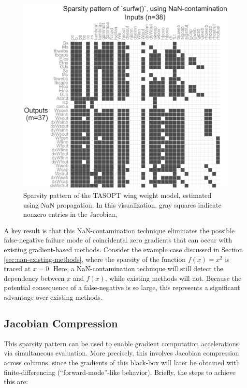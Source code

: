 \begin{figure}[H]
    \centering
    \includegraphics[width=6in]{../figures/nan-propagation/image2-crop.png}
    \caption{Sparsity pattern of the TASOPT wing weight model, estimated using NaN propagation. In this visualization, gray squares indicate nonzero entries in the Jacobian, }
    \label{fig:nan-jacobian}
\end{figure}

A key result is that this NaN-contamination technique eliminates the possible false-negative failure mode of coincidental zero gradients that can occur with existing gradient-based methods. Consider the example case discussed in Section \ref{sec:nan-existing-methods}, where the sparsity of the function $f(x) = x^2$ is traced at $x=0$. Here, a NaN-contamination technique will still detect the dependency between $x$ and $f(x)$, while existing methods will not. Because the potential consequence of a false-negative is so large, this represents a significant advantage over existing methods.

\subsection{Jacobian Compression}
\label{sec:nan-jacobian-compression}

This sparsity pattern can be used to enable gradient computation accelerations via simultaneous evaluation. More precisely, this involves Jacobian compression across columns, since the gradients of this black-box will later be obtained with finite-differencing (``forward-mode''-like behavior). Briefly, the steps to achieve this are:

